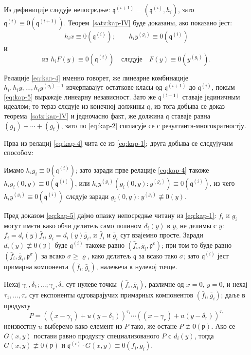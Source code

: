 \documentclass[11pt]{article}
\theoremstyle{plain}
\begin{document}
Из дефиниције слєдује непосрєдње:
$\mathfrak{q}^{(i+1)} = (\mathfrak{q}^{(i)}, h_{i})$, зато
$\mathfrak{q}^{(i)} \equiv 0(\mathfrak{q}^{(i+1)})$.
Теорем~\ref{satz:kap-IV} буде доказаны, ако показано јест:
\begin{equation}\label{eq:kap-4}
h_{i}x \equiv 0(\mathfrak{q}^{(i)}); \qquad
h_{i}y^{(g_{i})} \equiv 0(\mathfrak{q}^{(i)})
\end{equation}
и
\begin{equation}\label{eq:kap-5}
\text{из } h_{i}F(y) \equiv 0(\mathfrak{q}^{(i)})
\quad \text{слєдује} \quad F(y) \equiv 0(y^{(g_{i})}).
\end{equation}

Релације \eqref{eq:kap-4} именно говорет, же линеарне комбинације
$h_{i}, h_{i}y, \ldots, h_{i}y^{(g_{i})-1}$ изчерпавајут
остаткове класы од $\mathfrak{q}^{(i+1)}$ до
$\mathfrak{q}^{(i)}$, покым \eqref{eq:kap-5} выражаје линеарну
независност. Зато же $\mathfrak{q}^{(t+1)}$ ставаје јединичным
идеалом; то тераз слєдује из конечној должины $\mathfrak{q}$,
из тога добыва се доказ теорема~\ref{satz:kap-IV} и једночасно
факт, же должина $\mathfrak{q}$ ставаје равна
$(g_{1}) + \cdots + (g_{t})$, зато по \eqref{eq:kap-2} согласује се
с резултанта-многократностју.

Прва из релациј \eqref{eq:kap-4} чита се из \eqref{eq:kap-1};
друга добыва се слєдујучим способом:

Имамо $h_{i}g_{i} \equiv 0(\mathfrak{q}^{(i)})$; зато заради прве
релације \eqref{eq:kap-4} такоже
$h_{i}g_{i}(0,y) \equiv 0(\mathfrak{q}^{(i)})$, или
$h_{i}y^{(g_{i})}(g_{i}(0,y):y^{(g_{i})}) \equiv 0(\mathfrak{q}^{(i)})$,
из чего $h_{i}y^{(g_{i})} \equiv 0(\mathfrak{q}^{(i)})$
слєдује заради $g_{i}(0,y):y^{(g_{i})} \not\equiv 0(y)$.

Пред доказом \eqref{eq:kap-5} дајмо опазку непосрєдње читану из
\eqref{eq:kap-1}: $f_{i}$ и $g_{i}$ могут имєти како обчи дєлитељ
само полином $d_{i}(y)$ в $y$, не дєлимы с $y$:
$f_{i} = d_{i}(y)\bar{f}_{i}$, $g_{i} = d_{i}(y)\bar{g}_{i}$, и
$\bar{f}_{i}$ и $\bar{g}_{i}$ сут взајемно просте. Заради
$d_{i}(y) \not\equiv 0(\mathfrak{p})$ буде $\mathfrak{q}^{(i)}$
такоже равно $(\bar{f}_{i}, \bar{g}_{i}, \mathfrak{p}^{e})$;
при том то буде равно
$(\bar{f}_{i}, \bar{g}_{i}, \mathfrak{p}^{\sigma})$ за всако
$\sigma \geq \varrho$, како дєлитељ $\mathfrak{q}$ за всако
тако $\sigma$; зато $\mathfrak{q}^{(i)}$ јест примарна компонента
$(\bar{f}_{i}, \bar{g}_{i})$, належеча к нулевој точце.

Нехај $\gamma_{1}, \delta_{1}; \ldots; \gamma_{r}, \delta_{r}$ сут
нулеве точкы $(\bar{f}_{i}, \bar{g}_{i})$, различне од
$x = 0$, $y = 0$, и нехај $\tau_{1}, \ldots, \tau_{r}$ сут експоненты
одговарајучих примарных компонентов $(\bar{f}_{i}, \bar{g}_{i})$;
даље в продукту
\[
P = ((x-\gamma_{1}) + u(y-\delta_{1}))^{\tau_{1}} \cdots
((x-\gamma_{r}) + u(y-\delta_{r}))^{\tau_{r}}
\]
неизвєстну $u$ выберемо како елемент из $P$ тако, же остане
$P \not\equiv 0(\mathfrak{p})$. Ако се $G(x,y)$ постави равно
продукту специализованого $P$ с $d_{i}(y)$, тогда
$G(x,y) \not\equiv 0(\mathfrak{p})$ и
$\mathfrak{q}^{(i)} \cdot G(x,y) \equiv 0(f_{i}, g_{i})$.
\end{document}
